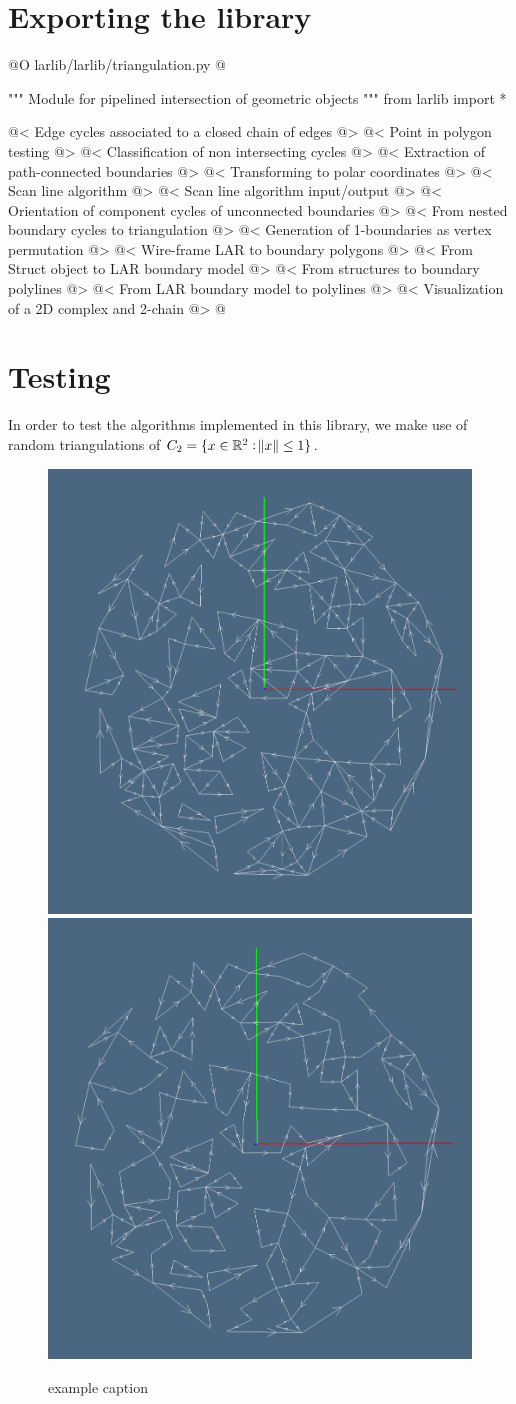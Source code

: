 \documentclass[11pt,oneside]{article}	%
\def\R{\mathbb{R}}
\begin{document}
\section{Exporting the library}

@O larlib/larlib/triangulation.py
@{""" Module for pipelined intersection of geometric objects """
from larlib import *

@< Edge cycles associated to a closed chain of edges @>
@< Point in polygon testing @>
@< Classification of non intersecting cycles @>
@< Extraction of path-connected boundaries @>
@< Transforming to polar coordinates @>
@< Scan line algorithm @>
@< Scan line algorithm input/output @>
@< Orientation of component cycles of unconnected boundaries @>
@< From nested boundary cycles to triangulation @>
@< Generation of 1-boundaries as vertex permutation @>
@< Wire-frame LAR to boundary polygons @>
@< From Struct object to LAR boundary model @>
@< From structures to boundary polylines @>
@< From LAR boundary model to polylines @>
@< Visualization of a 2D complex and 2-chain @>
@}


\section{Testing}

In order to test the algorithms implemented in this library, we make use of random triangulations of $C_2=\{x\in\R^2: \norm{x}\leq 1\}$.

\begin{figure}[htbp] %
   \centering
   \includegraphics[width=0.33\linewidth]{images/alg-tria0} 
   \includegraphics[width=0.33\linewidth]{images/alg-tria1} 
   \caption{example caption}
   \label{fig:example}
\end{figure}
\end{document}
